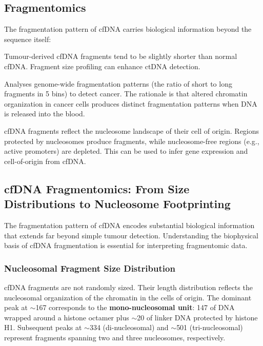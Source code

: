 \subsection{Fragmentomics}
\label{subsec:specialized:fragmentomics}

The fragmentation pattern of cfDNA carries biological information beyond the sequence itself:

\begin{description}[style=nextline, itemsep=3pt]
  \item[Fragment size distribution] Tumour-derived cfDNA fragments tend to be slightly shorter than normal cfDNA. Fragment size profiling can enhance ctDNA detection.

  \item[DELFI (DNA Evaluation of Fragments for early Interception)] Analyses genome-wide fragmentation patterns (the ratio of short to long fragments in 5\megabase{} bins) to detect cancer. The rationale is that altered chromatin organization in cancer cells produces distinct fragmentation patterns when DNA is released into the blood.

  \item[Nucleosome positioning] cfDNA fragments reflect the nucleosome landscape of their cell of origin. Regions protected by nucleosomes produce fragments, while nucleosome-free regions (e.g., active promoters) are depleted. This can be used to infer gene expression and cell-of-origin from cfDNA.
\end{description}

\subsection{cfDNA Fragmentomics: From Size Distributions to Nucleosome Footprinting}
\label{subsec:specialized:fragmentomics-detail}

The fragmentation pattern of cfDNA encodes substantial biological information that extends far beyond simple tumour detection. Understanding the biophysical basis of cfDNA fragmentation is essential for interpreting fragmentomic data.

\subsubsection{Nucleosomal Fragment Size Distribution}

cfDNA fragments are not randomly sized. Their length distribution reflects the nucleosomal organization of the chromatin in the cells of origin. The dominant peak at $\sim$167\basepair{} corresponds to the \textbf{mono-nucleosomal unit}: 147\basepair{} of DNA wrapped around a histone octamer plus $\sim$20\basepair{} of linker DNA protected by histone H1. Subsequent peaks at $\sim$334\basepair{} (di-nucleosomal) and $\sim$501\basepair{} (tri-nucleosomal) represent fragments spanning two and three nucleosomes, respectively.

